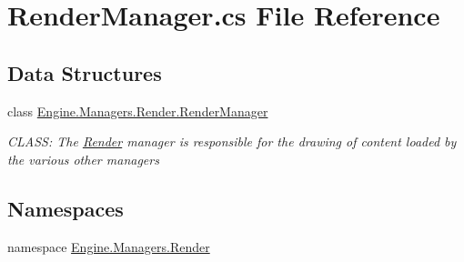 \hypertarget{a00176}{}\section{Render\+Manager.\+cs File Reference}
\label{a00176}
\subsection*{Data Structures}
\begin{DoxyCompactItemize}
\item 
class \hyperlink{a00526}{Engine.\+Managers.\+Render.\+Render\+Manager}
\begin{DoxyCompactList}\small\item\em C\+L\+A\+SS\+: The \hyperlink{a00271}{Render} manager is responsible for the drawing of content loaded by the various other managers \end{DoxyCompactList}\end{DoxyCompactItemize}
\subsection*{Namespaces}
\begin{DoxyCompactItemize}
\item 
namespace \hyperlink{a00271}{Engine.\+Managers.\+Render}
\end{DoxyCompactItemize}
